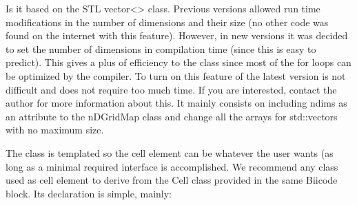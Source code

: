 \documentclass[12pt]{article}
\begin{document}
Is it based on the STL vector<> class. Previous versions allowed run time modifications in the number of dimensions and their size (no other code was found on the internet with this feature). However,
in new versions it was decided to set the number of dimensions in compilation time (since this is easy to predict). This gives a plus of efficiency to the class since most of the for loops can be optimized by the compiler. To turn on this feature of the latest version is not difficult and does not require too much time. If you are interested, contact the author for more information about this. It mainly consists on including ndims as an attribute to the nDGridMap class and change all the arrays for std::vectors with no maximum size.

The class is templated so the cell element can be whatever the user wants (as long as a minimal required interface is accomplished. We recommend any class used as cell element to derive from the Cell class provided in the same Biicode block. Its declaration is simple, mainly:
\end{document}
